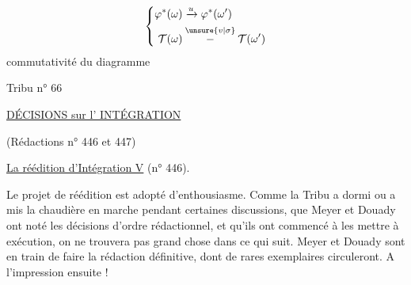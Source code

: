 \[
\left\{\begin{aligned}
\varphi^*(\omega)&\xrightarrow{u}\varphi^*(\omega')\\
\mathcal T(\omega)&\overset{\unsure{v|\sigma}}{\mathbin{-}}\mathcal T(\omega')
\end{aligned}\right.
\]
commutativité du diagramme
\begin{flushright}Tribu n° 66\end{flushright}
\begin{center}
\uline{DÉCISIONS sur l' INTÉGRATION}

(Rédactions n° 446 et 447)

\unsure{-:-:-:-}
\end{center}

\uline{La réédition d'Intégration V} (n° 446).

Le projet de réédition est adopté d'enthousiasme. Comme la Tribu a dormi ou a mis la chaudière en marche pendant certaines discussions, que Meyer et Douady ont noté les décisions d'ordre rédactionnel, et qu'ils ont commencé à les mettre à exécution, on ne trouvera pas grand chose dans ce qui suit. Meyer et Douady sont en train de faire la rédaction définitive, dont de rares exemplaires circuleront. A l'impression ensuite !

